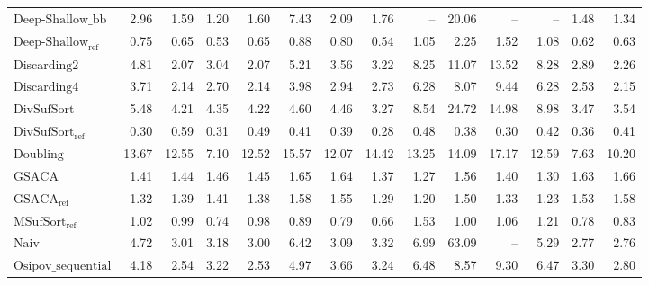 \begin{table}
{\begin{tabular}{lrrrrrrrrrrrrr}
    $\text{Deep-Shallow\_bb}$ & 2.96 & 1.59 & 1.20 & 1.60 & 7.43 & 2.09 & 1.76 & {\color{darkgray}--} & 20.06 & {\color{darkgray}--} & {\color{darkgray}--} & 1.48 & 1.34 \\
    $\text{Deep-Shallow}_{\text{ref}}$ & 0.75 & {\color{green!60!black}0.65} & {\color{green!60!black}0.53} & {\color{green!60!black}0.65} & 0.88 & 0.80 & 0.54 & 1.05 & 2.25 & 1.52 & 1.08 & 0.62 & 0.63 \\
    $\text{Discarding2}$ & 4.81 & 2.07 & 3.04 & 2.07 & 5.21 & 3.56 & 3.22 & 8.25 & 11.07 & {\color{red}13.52} & {\color{red}8.28} & 2.89 & 2.26 \\
    $\text{Discarding4}$ & 3.71 & 2.14 & 2.70 & 2.14 & 3.98 & 2.94 & 2.73 & 6.28 & 8.07 & 9.44 & 6.28 & 2.53 & 2.15 \\
    $\text{DivSufSort}$ & 5.48 & 4.21 & 4.35 & 4.22 & 4.60 & 4.46 & 3.27 & 8.54 & {\color{red}24.72} & {\color{red}14.98} & {\color{red}8.98} & 3.47 & 3.54 \\
    $\text{DivSufSort}_{\text{ref}}$ & {\color{green!60!black}0.30} & {\color{green!60!black}0.59} & {\color{green!60!black}0.31} & {\color{green!60!black}0.49} & {\color{green!60!black}0.41} & {\color{green!60!black}0.39} & {\color{green!60!black}0.28} & {\color{green!60!black}0.48} & {\color{green!60!black}0.38} & {\color{green!60!black}0.30} & {\color{green!60!black}0.42} & {\color{green!60!black}0.36} & {\color{green!60!black}0.41} \\
    $\text{Doubling}$ & {\color{red}13.67} & {\color{red}12.55} & {\color{red}7.10} & {\color{red}12.52} & {\color{red}15.57} & {\color{red}12.07} & {\color{red}14.42} & {\color{red}13.25} & 14.09 & {\color{red}17.17} & {\color{red}12.59} & {\color{red}7.63} & {\color{red}10.20} \\
    $\text{GSACA}$ & 1.41 & 1.44 & 1.46 & 1.45 & 1.65 & 1.64 & 1.37 & 1.27 & 1.56 & 1.40 & 1.30 & 1.63 & 1.66 \\
    $\text{GSACA}_{\text{ref}}$ & 1.32 & 1.39 & 1.41 & 1.38 & 1.58 & 1.55 & 1.29 & 1.20 & 1.50 & 1.33 & 1.23 & 1.53 & 1.58 \\
    $\text{MSufSort}_{\text{ref}}$ & 1.02 & 0.99 & 0.74 & 0.98 & 0.89 & 0.79 & 0.66 & 1.53 & 1.00 & 1.06 & 1.21 & 0.78 & 0.83 \\
    $\text{Naiv}$ & 4.72 & 3.01 & 3.18 & 3.00 & 6.42 & 3.09 & 3.32 & 6.99 & {\color{red}63.09} & {\color{darkgray}--} & 5.29 & 2.77 & 2.76 \\
    $\text{Osipov\_sequential}$ & 4.18 & 2.54 & 3.22 & 2.53 & 4.97 & 3.66 & 3.24 & 6.48 & 8.57 & 9.30 & 6.47 & 3.30 & 2.80 \\

\end{tabular}}
\end{table}
